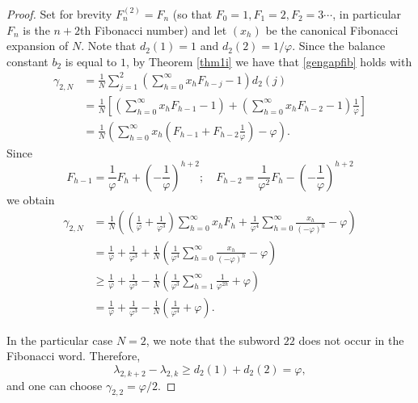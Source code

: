 \documentclass[10pt,a4paper]{amsart}
\begin{document}
\begin{proof}
Set for brevity $F^{(2)}_n=F_n$ (so that $F_0=1, F_1=2,F_2=3\cdots$, in particular $F_n$ is the $n+2$th Fibonacci number) and let $(x_h)$ be the canonical Fibonacci expansion of $N$. Note that $d_2(1)=1$ and $d_2(2)=1/\varphi$. Since the balance constant $b_2$ is equal to $1$, by Theorem \ref{thm1i} we have that 
\eqref{gengapfib} holds with 
\begin{align*}\gamma_{2,N}
&=
\frac{1}{N}
\sum_{j=1}^2
\left(
\sum_{h=0}^\infty x_h F_{h-j} - 1
\right)d_2(j)\\
&=
\frac{1}{N}
\left[
\left(\sum_{h=0}^\infty x_h F_{h-1} -1\right)
+
\left(\sum_{h=0}^\infty x_h F_{h-2} -1\right)\frac{1}{\varphi}
\right] \\
&=
\frac{1}{N}
\left(
\sum_{h=0}^\infty x_h\left(F_{h-1}+F_{h-2}\frac{1}{\varphi}\right)
-\varphi
\right).
\end{align*}
Since 
$$F_{h-1}=\frac{1}{\varphi} F_h +  \left(-\frac{1}{\varphi}\right)^{h+2};\quad F_{h-2}=\frac{1}{\varphi^2} F_h -  \left(-\frac{1}{\varphi}\right)^{h+2} $$
we obtain
\begin{align*}\gamma_{2,N}&=\frac{1}{ N}\left(\left(\frac{1}{\varphi}+\frac{1}{\varphi^3}\right) \sum_{h=0}^\infty x_h F_h+ \frac{1}{\varphi^4}\sum_{h=0}^\infty  \frac{x_h}{(-\varphi)^h}-\varphi\right)\\
&=\frac{1}{\varphi}+\frac{1}{\varphi^3} +\frac{1}{ N}\left(\frac{1}{\varphi^4}\sum_{h=0}^\infty \frac{x_h}{(-\varphi)^h}-\varphi\right)\\
&\geq\frac{1}{\varphi}+\frac{1}{\varphi^3}  -\frac{1}{ N}\left(\frac{1}{\varphi^3}\sum_{h=1}^\infty \frac{1}{\varphi^{2h}}+\varphi\right)\\
&= \frac{1}{\varphi}+\frac{1}{\varphi^3} -\frac{1}{N}\left(\frac{1}{\varphi^4}+\varphi\right).
\end{align*}


In the particular case $N=2$, we note that the subword $22$ does not occur
in the Fibonacci word.
Therefore,
\[
\lambda_{2,k+2}-\lambda_{2,k}\ge d_2(1)+d_2(2)=\varphi,
\]
and one can choose $\gamma_{2,2}=\varphi/2$.


\end{proof}
\end{document}
